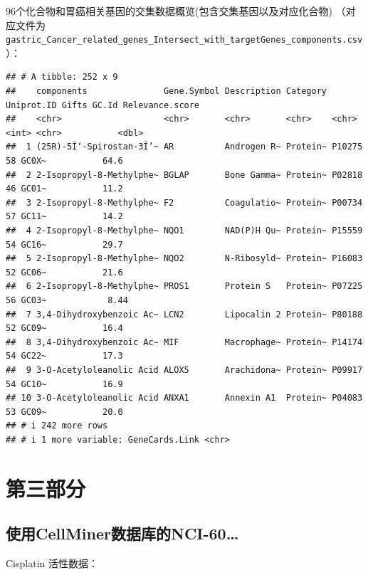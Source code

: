 \documentclass[
]{article}
\begin{document}
96个化合物和胃癌相关基因的交集数据概览(包含交集基因以及对应化合物)
（对应文件为\texttt{gastric\_Cancer\_related\_genes\_Intersect\_with\_targetGenes\_components.csv}）：

\begin{verbatim}
## # A tibble: 252 x 9
##    components               Gene.Symbol Description Category Uniprot.ID Gifts GC.Id Relevance.score
##    <chr>                    <chr>       <chr>       <chr>    <chr>      <int> <chr>           <dbl>
##  1 (25R)-5Î‘-Spirostan-3Î’~ AR          Androgen R~ Protein~ P10275        58 GC0X~           64.6 
##  2 2-Isopropyl-8-Methylphe~ BGLAP       Bone Gamma~ Protein~ P02818        46 GC01~           11.2 
##  3 2-Isopropyl-8-Methylphe~ F2          Coagulatio~ Protein~ P00734        57 GC11~           14.2 
##  4 2-Isopropyl-8-Methylphe~ NQO1        NAD(P)H Qu~ Protein~ P15559        54 GC16~           29.7 
##  5 2-Isopropyl-8-Methylphe~ NQO2        N-Ribosyld~ Protein~ P16083        52 GC06~           21.6 
##  6 2-Isopropyl-8-Methylphe~ PROS1       Protein S   Protein~ P07225        56 GC03~            8.44
##  7 3,4-Dihydroxybenzoic Ac~ LCN2        Lipocalin 2 Protein~ P80188        52 GC09~           16.4 
##  8 3,4-Dihydroxybenzoic Ac~ MIF         Macrophage~ Protein~ P14174        54 GC22~           17.3 
##  9 3-O-Acetyloleanolic Acid ALOX5       Arachidona~ Protein~ P09917        54 GC10~           16.9 
## 10 3-O-Acetyloleanolic Acid ANXA1       Annexin A1  Protein~ P04083        53 GC09~           20.0 
## # i 242 more rows
## # i 1 more variable: GeneCards.Link <chr>
\end{verbatim}

\hypertarget{ux7b2cux4e09ux90e8ux5206}{%
\section{第三部分}\label{ux7b2cux4e09ux90e8ux5206}}

\hypertarget{ux4f7fux7528cellminerux6570ux636eux5e93ux7684nci-60}{%
\subsection{使用CellMiner数据库的NCI-60\ldots{}}\label{ux4f7fux7528cellminerux6570ux636eux5e93ux7684nci-60}}

Cisplatin 活性数据：
\end{document}
